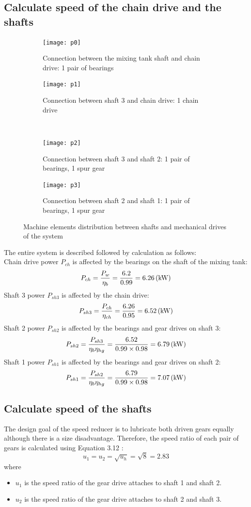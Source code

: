\subsection{Calculate speed of  the chain drive and the shafts}
\begin{figure}[h]
	\centering
	\begin{subfigure}[t]{.4\linewidth}
		\centering
		\texttt{[image: p0]}
		\caption{Connection between the mixing tank shaft and chain drive: 1 pair of bearings}
		\label{fig:sub1}
	\end{subfigure}\hspace*{0.1\linewidth}
	\begin{subfigure}[t]{.4\linewidth}
		\centering
		\texttt{[image: p1]}
		\caption{Connection between shaft 3 and chain drive: 1 chain drive}
		\label{fig:sub2}
	\end{subfigure}\\
	\begin{subfigure}[t]{.4\linewidth}
		\centering
		\texttt{[image: p2]}
		\caption{Connection between shaft 3 and shaft 2: 1 pair of bearings, 1 spur gear}
		\label{fig:sub3}
	\end{subfigure}\hspace*{0.1\linewidth}	
	\begin{subfigure}[t]{.4\linewidth}
		\centering
		\texttt{[image: p3]}
		\caption{Connection between shaft 2 and shaft 1: 1 pair of bearings, 1 spur gear}
		\label{fig:sub4}
	\end{subfigure}
	\caption{Machine elements distribution between shafts and mechanical drives of the system}
	\label{fig:test}
\end{figure}
The entire system is described followed by calculation as follows:\\
Chain drive power $ P_{ch} $ is affected by the bearings on the shaft of the mixing tank:
\[ P_{ch} = \dfrac{P_w}{\eta_b} = \dfrac{6.2}{0.99} = 6.26 \, (\mathrm{kW})\]
Shaft 3 power $ P_{sh3} $ is affected by the chain drive:
\[ P_{sh3} = \dfrac{P_{ch}}{\eta_{ch}} = \dfrac{6.26}{0.95} = 6.52 \, (\mathrm{kW})\]
Shaft 2 power $ P_{sh2} $ is affected by the bearings and gear drives on shaft 3:
\[ P_{sh2} = \dfrac{P_{sh3}}{\eta_b\eta_{hg}} = \dfrac{6.52}{0.99 \times 0.98} = 6.79 \, (\mathrm{kW})\]
Shaft 1 power $ P_{sh1} $ is affected by the bearings and gear drives on shaft 2:
\[ P_{sh1} = \dfrac{P_{sh2}}{\eta_b\eta_{hg}} = \dfrac{6.79}{0.99 \times 0.98} = 7.07 \, (\mathrm{kW})\]

\subsection{Calculate speed of the shafts} The design goal of the speed reducer is to lubricate both driven gears equally although there is a size disadvantage. Therefore, the speed ratio of each pair of gears  is calculated using Equation 3.12 \cite{tk1}:
\[u_1=u_2=\sqrt{u_h}=\sqrt{8}=2.83\]
where
\begin{itemize}
	\item $ u_1 $ is the speed ratio of the gear drive attaches to shaft 1 and shaft 2.
	\item $ u_2 $ is the speed ratio of the gear drive attaches to shaft 2 and shaft 3.
\end{itemize}

